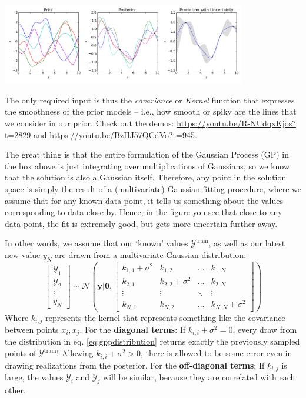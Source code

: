 \documentclass{article}
\begin{document}
\begin{center}\includegraphics[width=0.8\textwidth]{Gaussian_Process_Regression.png}\end{center}
The only required input is thus the \textit{covariance} or \textit{Kernel} function that expresses the smoothness of the prior models -- i.e., how smooth or spiky are the lines that we consider in our prior. Check out the demos: \url{https://youtu.be/R-NUdqxKjos?t=2829} and  \url{https://youtu.be/BzHJ57QCdVo?t=945}.

The great thing is that the entire formulation of the Gaussian Process (GP) in the box above is just integrating over multiplications of Gaussians, so we know that the solution is also a Gaussian itself. Therefore, any point in the solution space is simply the result of a (multivariate) Gaussian fitting procedure, where we assume that for any known data-point, it tells us something about the values corresponding to data close by. Hence, in the figure you see that close to any data-point, the fit is extremely good, but gets more uncertain further away. 

In other words, we assume that our `known' values $\mathcal{Y}^\text{train}$, as well as our latest new value $y_N$ are drawn from a multivariate Gaussian distribution:
\begin{equation}
    \left[ \begin{array}{c} \mathcal{Y}_1 \\ \mathcal{Y}_2 \\ \vdots \\ y_N \end{array} \right] \sim \mathcal{N}\left( \mathbf{y} \Bigg| \mathbf{0}, \left[ \begin{array}{cccc} k_{1,1}+\sigma^2 & k_{1,2} & \dots & k_{1,N} \\ k_{2,1} & k_{2,2}+\sigma^2 & \dots & k_{2,N} \\ \vdots & \vdots & \ddots & \vdots \\ k_{N,1} & k_{N,2} & \dots & k_{N,N}+\sigma^2 \end{array} \right] \right)\label{eq:gppdistribution}
\end{equation}
Where $k_{i,j}$ represents the kernel that represents something like the covariance between points $x_i,x_j$. For the \textbf{diagonal terms}: If $k_{i,i}+\sigma^2=0$, every draw from the distribution in eq. \eqref{eq:gppdistribution} returns exactly the previously sampled points of $\mathcal{Y}^\text{train}$! Allowing $k_{i,i}+\sigma^2>0$, there is allowed to be some error even in drawing realizations from the posterior. For the \textbf{off-diagonal terms}: If $k_{i,j}$ is large, the values $\mathcal{Y}_i$ and $\mathcal{Y}_j$ will be similar, because they are correlated with each other.
\end{document}
